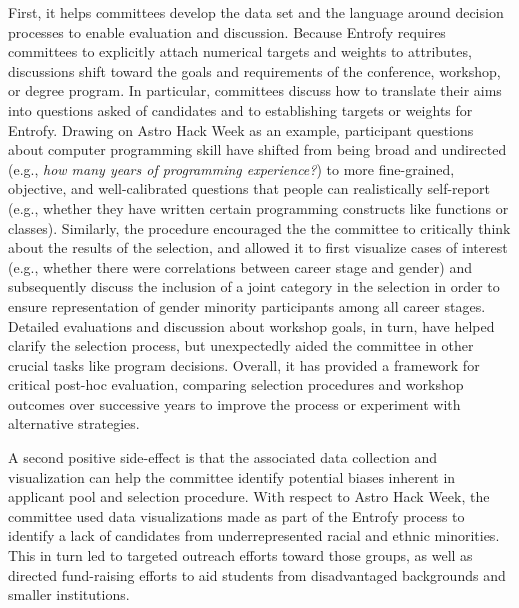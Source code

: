 \documentclass[10pt,letterpaper]{article}
\begin{document}
First, it helps committees develop the data set and the language around decision processes to enable evaluation and discussion.
Because Entrofy requires committees to explicitly attach numerical targets and weights to attributes, discussions shift toward the goals and requirements of the conference, workshop, or degree program. In particular, committees discuss how to translate their aims into questions asked of candidates and to establishing targets or weights for Entrofy.
Drawing on Astro Hack Week as an example, participant questions about computer programming skill have shifted from being broad and undirected (e.g., \emph{how many years of programming experience?}) to more fine-grained, objective, and well-calibrated questions that people can realistically self-report (e.g., whether they have written certain programming constructs like functions or classes).
Similarly, the procedure encouraged the the committee to critically think about the results of the selection, and allowed it to first visualize cases of interest (e.g., whether there were correlations between career stage and gender) and subsequently discuss the inclusion of a joint category in the selection in order to ensure representation of gender minority participants among all career stages.
Detailed evaluations and discussion about workshop goals, in turn, have helped clarify the selection process, but unexpectedly aided the committee in other crucial tasks like program decisions. 
Overall, it has provided a framework for critical post-hoc evaluation, comparing selection procedures and workshop outcomes over successive years to improve the process or experiment with alternative strategies.

A second positive side-effect is that the associated data collection and visualization can help the committee identify potential biases inherent in applicant pool and selection procedure.
With respect to Astro Hack Week, the committee used data visualizations made as part of the Entrofy process to identify a lack of candidates from underrepresented racial and ethnic minorities.
This in turn led to targeted outreach efforts toward those groups, as well as directed fund-raising efforts to aid students from disadvantaged backgrounds and smaller institutions.  
\end{document}
